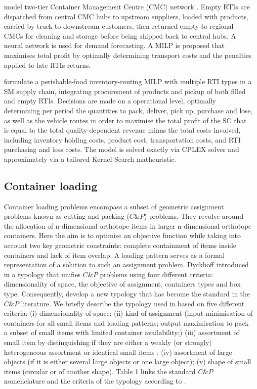 \autocite{GUO2024104339} model two-tier Container Management Centre (CMC) network . Empty RTIs are dispatched from central CMC hubs to upstream suppliers, loaded with products, carried by truck to downstream customers, then returned empty to regional CMCs for cleaning and storage before being shipped back to central hubs. A neural network is used for demand forecasting. A MILP is proposed that maximises total profit by optimally determining transport costs and the penalties applied to late RTIs returns.


\autocite{Zhang17012024} formulate a perishable-food inventory-routing MILP with multiple RTI types in a SM supply chain, integrating procurement of products and pickup of both filled and empty RTIs. Decisions are made on a operational level, optimally determining per period the quantities to pack, deliver, pick up, purchase and lose, as well as the vehicle routes in order to maximise the total profit of the SC that is equal to the total quality-dependent revenue minus the total costs involved, including inventory holding costs, product cost, transportation costs, and RTI purchasing and loss costs. The model is solved exactly via CPLEX  solver and approximately via a tailored Kernel Search matheuristic.


\subsection{Container loading}

Container loading problems encompass a subset of geometric assignment problems known as cutting and packing ($C\&P$) problems. They revolve around the allocation of n-dimensional orthotope items in larger n-dimensional orthotope containers. Here the aim is to optimise an objective function while taking into account two key geometric constraints: complete containment of items inside containers and lack of item overlap. A loading pattern serves as a formal representation of a solution to such an assignment problem.
Dyckhoff introduced in \autocite{Dyckhoff1990AProblems} a typology that unifies $C\&P$ problems using four different criteria: dimensionality of space, the objective of assignment, containers types and box type. Consequently, \autocite{Wascher2007AnProblems} develop a new typology that has become the standard in the $C\&P$ literature. We   briefly  describe  the  typology  used  in  \autocite{Wascher2007AnProblems}  based  on  five different criteria: (i) dimensionality of space; (ii) kind of assignment (input minimisation of containers for all small items and loading patterns; output maximisation to pack a subset of small items with limited container availability;) (iii) assortment of small item by distinguishing if they are either a weakly (or strongly) heterogeneous assortment or identical small items ; (iv) assortment of large objects (if it is either several large objects or one large object); (v) shape of small items (circular or of another shape). Table 1 links the standard $C\&P$ nomenclature and the criteria of the typology according to \autocite{Wascher2007AnProblems}.






